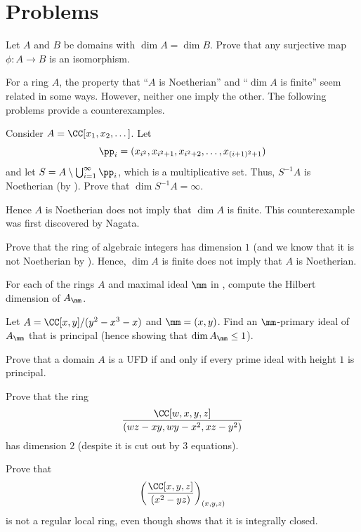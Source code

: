 \section{Problems}
\begin{problem}
Let $A$ and $B$ be domains with $\dim A=\dim B$.
Prove that any surjective map $\phi : A\to B$ is an isomorphism.
\end{problem}
\begin{problem}
\label{prob:dim_pathology}
For a ring $A$, the property that ``$A$ is Noetherian''
and ``$\dim A$ is finite'' seem related in some ways.
However, neither one imply the other.
The following problems provide a counterexamples.
\begin{alphenum}
\item Consider $A=\CC[x_1,x_2,\dots]$. Let 
$$\pp_i = (x_{i^2}, x_{i^2+1}, x_{i^2+2}, \dots, 
x_{(i+1)^2+1})$$
and let $S=A\setminus \bigcup_{i=1}^\infty \pp_i$,
which is a multiplicative set.
Thus, $S^{-1}A$ is Noetherian 
(by ).
Prove that $\dim S^{-1}A = \infty$.

Hence $A$ is Noetherian does not imply that $\dim A$
is finite.
This counterexample was first discovered by Nagata.
\item Prove that the ring of algebraic integers 
has dimension $1$ (and we know that it is not Noetherian by 
).
Hence, $\dim A$ is finite does not imply that 
$A$ is Noetherian.
\end{alphenum}
\end{problem}
\begin{problem}
For each of the rings $A$ and maximal ideal $\mm$ in , compute the Hilbert dimension of $A_\mm$.
\end{problem}
\begin{problem}
Let $A=\CC[x,y]/(y^2-x^3-x)$ and $\mm=(x,y)$.
Find an $\mm$-primary ideal of $A_\mm$ that is principal (hence showing that $\dim A_\mm \leq 1$).
\end{problem}
\begin{problem}
Prove that a domain $A$ is a UFD if and only if 
every prime ideal with height $1$ is principal.
\end{problem}
\begin{problem}
Prove that the ring
$$\frac{\CC[w,x,y,z]}{(wz-xy, wy-x^2, xz-y^2)}$$
has dimension $2$ (despite it is cut out by $3$ equations).
\end{problem}
\begin{problem}
Prove that 
$$\left(\frac{\CC[x,y,z]}{(x^2-yz)}\right)_{(x,y,z)}$$
is not a regular local ring, even though  shows that it is integrally closed.
\end{problem}

